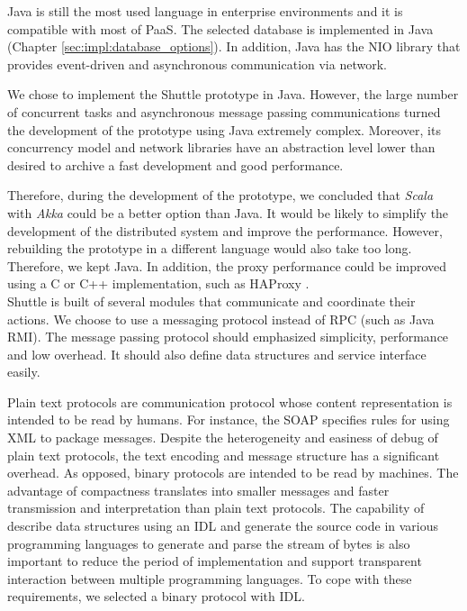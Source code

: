 Java is still the most used language in enterprise environments and it is compatible with most of \ac{PaaS}. The selected database is implemented in Java (Chapter \ref{sec:impl:database_options}). In addition, Java has the \ac{NIO} library that provides event-driven and asynchronous communication via network. %

We chose to implement the Shuttle prototype in Java. However, the large number of concurrent tasks and asynchronous message passing communications turned the development of the prototype using Java extremely complex. Moreover, its concurrency model and network libraries have an abstraction level lower than desired to archive a fast development and good performance.

Therefore, during the development of the prototype, we concluded that \emph{Scala} with \emph{Akka} could be a better option than Java. It would be likely to simplify the development of the distributed system and improve the performance. However, rebuilding the prototype in a different language would also take too long. Therefore, we kept Java.
In addition, the proxy performance could be improved using a C or C++ implementation, such as HAProxy \cite{haproxy}. \\

Shuttle is built of several modules that communicate and coordinate their actions. We choose to use a messaging protocol instead of \ac{RPC} (such as Java \ac{RMI}). The message passing protocol should emphasized simplicity, performance and low overhead. It should also define data structures and service interface easily. 

Plain text protocols are communication protocol whose content representation is intended to be read by humans. For instance, the \ac{SOAP} \cite{soap} specifies rules for using XML to package messages. Despite the heterogeneity and easiness of debug of plain text protocols, the text encoding and message structure has a significant overhead. As opposed, binary protocols are intended to be read by machines. The advantage of compactness translates into smaller messages and faster transmission and interpretation than plain text protocols. The capability of describe data structures using an \ac{IDL} and generate the source code in various programming languages to generate and parse the stream of bytes is also important to reduce the period of implementation and support transparent interaction between multiple programming languages. To cope with these requirements, we selected a binary protocol with \ac{IDL}. 

